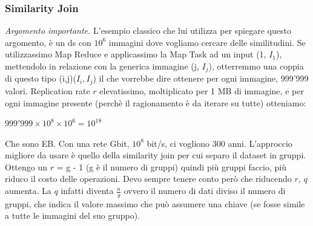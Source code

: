 \subsubsection{Similarity Join}
\textit{Argomento importante.} L'esempio classico che lui utilizza per spiegare questo argomento, è un ds con $10^6$ immagini dove vogliamo cercare delle similitudini. Se utilizzassimo Map Reduce e applicassimo la Map Task ad un input (1, $I_1$), mettendolo in relazione con la generica immagine (j, $I_j$), otterremmo una coppia di questo tipo (i,j)($I_i ,I_j$) il che vorrebbe dire ottenere per ogni immagine, 999'999 valori. Replication rate $r$ elevatissimo, moltiplicato per 1 MB di immagine, e per ogni immagine presente (perchè il ragionamento è da iterare su tutte) otteniamo:
\begin{center}
    \begin{math}
        999'999 \times 10^8 \times 10^6 = 10^{18}
    \end{math}
\end{center}
Che sono EB. Con una rete Gbit, $10^8$ bit/s, ci vogliono 300 anni. L'approccio migliore da usare è quello della similarity join per cui separo il dataset in gruppi. Ottengo un $r$ = g - 1 (g è il numero di gruppi) quindi più gruppi faccio, più riduco il costo delle operazioni. Devo sempre tenere conto però che riducendo $r$, $q$ aumenta. La $q$ infatti diventa $\frac{n}{g}$ ovvero il numero di dati diviso il numero di gruppi, che indica il valore massimo che può assumere una chiave (se fosse simile a tutte le immagini del suo gruppo).